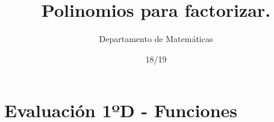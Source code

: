 \documentclass[palatino,nochap]{Docencia}
\title{Polinomios para factorizar.}
\author{Departamento de Matemáticas}
\date{18/19}
\begin{document}
\pagestyle{plain}

\section{Evaluación 1ºD - Funciones}


\end{document}
